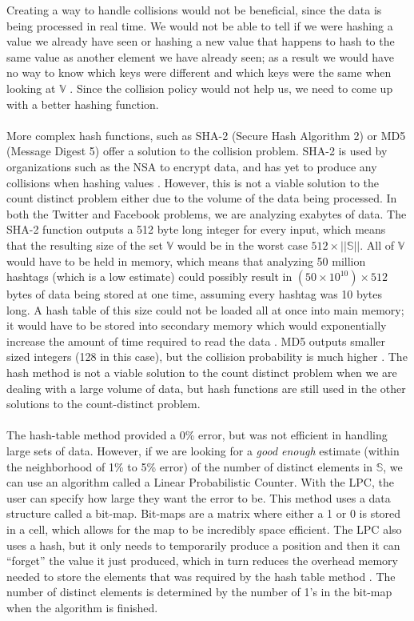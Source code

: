 \documentclass{article}
\begin{document}
Creating a way to handle collisions would not be beneficial, since the data is being processed in real time. 
We would not be able to tell if we were hashing a value we already have seen or hashing a new value that happens to hash to the same value as another element we have already seen; as a result we would have no way to know which keys were different and which keys were the same when looking at $\mathbb{V}$ \cite[p. 6]{Maurer}. 
Since the collision policy would not help us, we need to come up with a better hashing function. 
\\\\
\indent More complex hash functions, such as SHA-2 (Secure Hash Algorithm 2) or MD5 (Message Digest 5) offer a solution to the collision problem. SHA-2 is used by organizations such as the NSA to encrypt data, and has yet to produce any collisions when hashing values \cite[p. 301]{SHA-Algo}. However, this is not a viable solution to the count distinct problem either due to the volume of the data being processed. In both the Twitter and Facebook problems, we are analyzing exabytes of data. The SHA-2 function outputs a 512 byte long integer for every input, which means that the resulting size of the set $\mathbb{V}$ would be in the worst case $512 \times ||\mathbb{S}||$. All of $\mathbb{V}$ would have to be held in memory, which means that analyzing 50 million hashtags (which is a low estimate)\cite{Twitter} could possibly result in $(50 \times 10^{10}) \times 512$ bytes of data being stored at one time, assuming every hashtag was 10 bytes long. A hash table of this size could not be loaded all at once into main memory; it would have to be stored into secondary memory which would exponentially increase the amount of time required to read the data \cite[p. 209]{Whang}. MD5 outputs smaller sized integers (128 in this case), but the collision probability is much higher \cite[p. 22 - 23]{Break-MD5}. The hash method is not a viable solution to the count distinct problem when we are dealing with a large volume of data, but hash functions are still used in the other solutions to the count-distinct problem.
\\\\
\indent The hash-table method provided a 0\% error, but was not efficient in handling large sets of data. However, if we are looking for a \textit{good enough} estimate (within the neighborhood of 1\% to 5\% error) of the number of distinct elements in $\mathbb{S}$, we can use an algorithm called a Linear Probabilistic Counter. With the LPC, the user can specify how large they want the error to be. This method uses a data structure called a bit-map. Bit-maps are a matrix where either a 1 or 0 is stored in a cell, which allows for the map to be incredibly space efficient. The LPC also uses a hash, but it only needs to temporarily produce a position and then it can ``forget'' the value it just produced, which in turn reduces the overhead memory needed to store the elements that was required by the hash table method \cite{Whang}. The number of distinct elements is determined by the number of 1's in the bit-map when the algorithm is finished.
\end{document}
